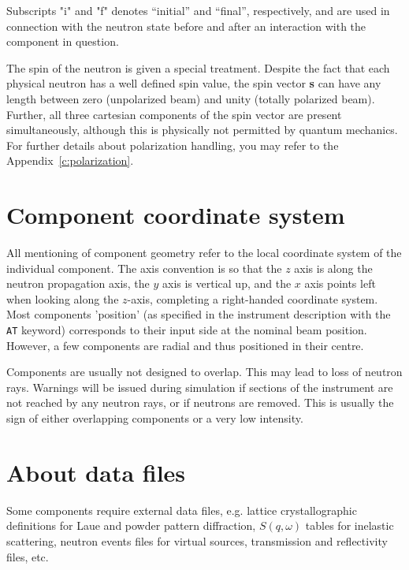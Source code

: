 Subscripts "i" and "f" denotes ``initial'' and ``final'', respectively,
and are used in connection with the neutron state before and after
an interaction with the component in question.

The spin of the neutron is given a special treatment. Despite
the fact that each physical neutron has a well defined spin value,
the \MCS spin vector
{\bf s} can have any length between zero (unpolarized beam) and unity
(totally polarized beam). Further, all three cartesian components of
the spin vector are present simultaneously, although this is physically
not permitted by quantum mechanics.
For further details about polarization handling, you may refer to the Appendix~\ref{c:polarization}.

\section{Component coordinate system}
All mentioning of component geometry refer to
the local coordinate system of the individual component.
The axis convention is so that the $z$ axis is along
the neutron propagation axis, the $y$ axis is vertical up,
and the $x$ axis points left when looking along the $z$-axis,
completing a right-handed coordinate system.
Most components 'position' (as specified in the instrument description
with the \verb+AT+ keyword) corresponds to their input side at the nominal
beam position.
However, a few components are radial and thus positioned in their centre.

Components are usually not designed to overlap.
This may lead to loss of neutron rays.
Warnings will be issued during simulation if sections of the instrument
are not reached by any neutron rays, or if neutrons are removed.
This is usually the sign of either overlapping components
or a very low intensity.

\section{About data files}
Some components require external data files,
e.g. lattice crystallographic definitions for Laue and powder pattern diffraction,
$S(q,\omega)$ tables for inelastic scattering,
neutron events files for virtual sources,
transmission and reflectivity files, etc.

